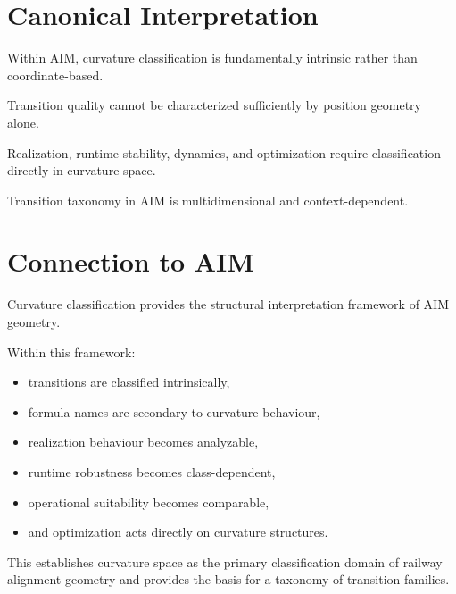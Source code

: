 \section{Canonical Interpretation}

\begin{proposition}
Within AIM, curvature classification is fundamentally intrinsic rather
than coordinate-based.
\end{proposition}

\begin{proposition}
Transition quality cannot be characterized sufficiently by position
geometry alone.
\end{proposition}

\begin{proposition}
Realization, runtime stability, dynamics, and optimization require
classification directly in curvature space.
\end{proposition}

\begin{proposition}
Transition taxonomy in AIM is multidimensional and context-dependent.
\end{proposition}

\section{Connection to AIM}

\begin{summary}
Curvature classification provides the structural interpretation framework
of AIM geometry.

Within this framework:
\begin{itemize}
\item transitions are classified intrinsically,
\item formula names are secondary to curvature behaviour,
\item realization behaviour becomes analyzable,
\item runtime robustness becomes class-dependent,
\item operational suitability becomes comparable,
\item and optimization acts directly on curvature structures.
\end{itemize}

This establishes curvature space as the primary classification domain of
railway alignment geometry and provides the basis for a taxonomy of
transition families.
\end{summary}
